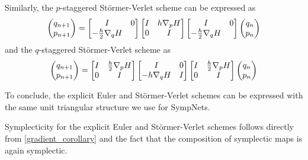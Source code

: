 \documentclass[twoside,a4paper]{article}
\begin{document}
Similarly, the $p$-staggered Störmer-Verlet scheme can be expressed as
\begin{equation*}
	\begin{pmatrix}
		q_{n+1} \\
		p_{n+1}
	\end{pmatrix} =
	\begin{bmatrix}
		I & 0 \\
		-\frac{h}{2} \grad[q]{H}
	\end{bmatrix}
	\begin{bmatrix}
		I & h \grad[p]{H} \\
		0 & I
	\end{bmatrix}
	\begin{bmatrix}
		I & 0 \\
		-\frac{h}{2} \grad[q]{H}
	\end{bmatrix}
	\begin{pmatrix}
		q_{n} \\
		p_{n}
	\end{pmatrix}
\end{equation*}
and the $q$-staggered Störmer-Verlet scheme as
\begin{equation*}
	\begin{pmatrix}
		q_{n+1} \\
		p_{n+1}
	\end{pmatrix} =
	\begin{bmatrix}
		I & \frac{h}{2} \grad[p]{H} \\
		0 & I
	\end{bmatrix}
	\begin{bmatrix}
		I & 0 \\
		-h \grad[q]{H} & I
	\end{bmatrix}
	\begin{bmatrix}
		I & \frac{h}{2} \grad[p]{H} \\
		0 & I
	\end{bmatrix}
	\begin{pmatrix}
		q_{n} \\
		p_{n}
	\end{pmatrix}
\end{equation*}

To conclude, the explicit Euler and Störmer-Verlet schemes can be expressed with
the same unit triangular structure we use for SympNets. 

Symplecticity for the explicit Euler and Störmer-Verlet schemes follows directly 
from \cref{gradient_corollary} and the fact that the composition of symplectic maps is again symplectic.
\end{document}
